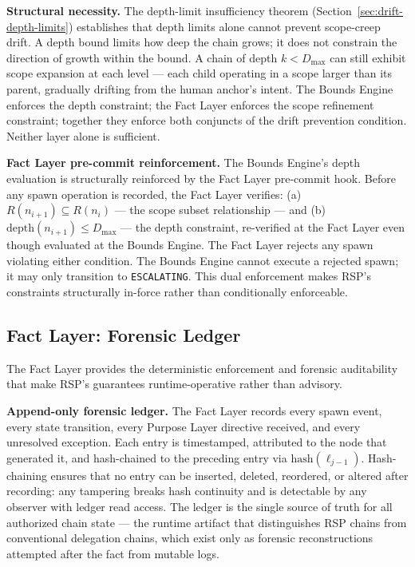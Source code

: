 \medskip
\noindent\textbf{Structural necessity.} The depth-limit insufficiency theorem (Section~\ref{sec:drift-depth-limits}) establishes that depth limits alone cannot prevent scope-creep drift. A depth bound limits how deep the chain grows; it does not constrain the direction of growth within the bound. A chain of depth $k < D_{\mathrm{max}}$ can still exhibit scope expansion at each level — each child operating in a scope larger than its parent, gradually drifting from the human anchor's intent. The Bounds Engine enforces the depth constraint; the Fact Layer enforces the scope refinement constraint; together they enforce both conjuncts of the drift prevention condition. Neither layer alone is sufficient.

\medskip
\noindent\textbf{Fact Layer pre-commit reinforcement.} The Bounds Engine's depth evaluation is structurally reinforced by the Fact Layer pre-commit hook. Before any spawn operation is recorded, the Fact Layer verifies: (a) $R(n_{i+1}) \subseteq R(n_i)$ — the scope subset relationship — and (b) $\mathrm{depth}(n_{i+1}) \leq D_{\mathrm{max}}$ — the depth constraint, re-verified at the Fact Layer even though evaluated at the Bounds Engine. The Fact Layer rejects any spawn violating either condition. The Bounds Engine cannot execute a rejected spawn; it may only transition to \texttt{ESCALATING}. This dual enforcement makes RSP's constraints structurally in-force rather than conditionally enforceable.

\subsection{Fact Layer: Forensic Ledger}
\label{sec:rs-fact-ledger}

The Fact Layer provides the deterministic enforcement and forensic auditability that make RSP's guarantees runtime-operative rather than advisory.

\medskip
\noindent\textbf{Append-only forensic ledger.} The Fact Layer records every spawn event, every state transition, every Purpose Layer directive received, and every unresolved exception. Each entry is timestamped, attributed to the node that generated it, and hash-chained to the preceding entry via $\mathrm{hash}(\ell_{j-1})$. Hash-chaining ensures that no entry can be inserted, deleted, reordered, or altered after recording: any tampering breaks hash continuity and is detectable by any observer with ledger read access. The ledger is the single source of truth for all authorized chain state — the runtime artifact that distinguishes RSP chains from conventional delegation chains, which exist only as forensic reconstructions attempted after the fact from mutable logs.

